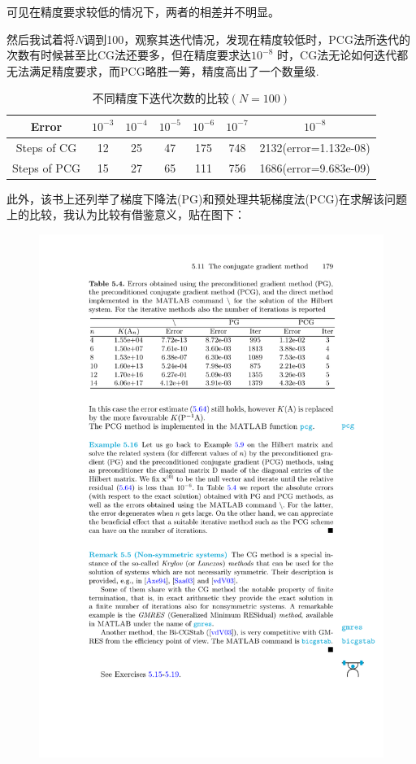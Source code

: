 可见在精度要求较低的情况下，两者的相差并不明显。

然后我试着将$N$调到100，观察其迭代情况，发现在精度较低时，PCG法所迭代的次数有时候甚至比CG法还要多，但在精度要求达$10^{-8}$ 时，CG法无论如何迭代都无法满足精度要求，而PCG略胜一筹，精度高出了一个数量级.

\begin{table}[htbp]
  \centering
  \caption{不同精度下迭代次数的比较$(N=100)$}
    \begin{tabular}{ccccccc}
\toprule
{Error} &		$10^{-3}$	&		$10^{-4}$		&		$10^{-5}$		&$10^{-6}$		&		$10^{-7}$		& 	$10^{-8}$ \\
	\midrule
{Steps of CG}&12&	25&	47&175&748  & 2132(error=1.132e-08)  \\
{Steps of PCG}&15&	27&	65&111&756   & 1686(error=9.683e-09)\\
\bottomrule
    \end{tabular}
\end{table}


此外，该书上还列举了梯度下降法(PG)和预处理共轭梯度法(PCG)在求解该问题上的比较，我认为比较有借鉴意义，贴在图下：
\begin{figure}[H]
\centering
\includegraphics[width=12.5cm]{fig/5_6.pdf}
\end{figure}

